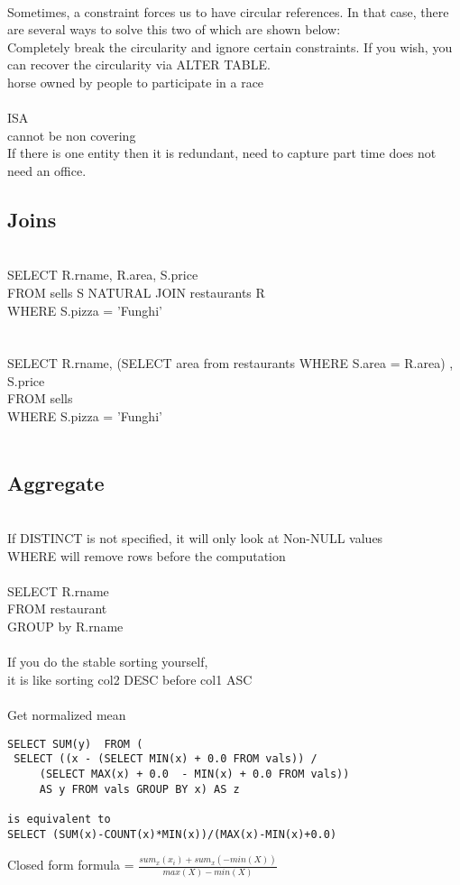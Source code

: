\documentclass[11pt]{article}
\begin{document}
\\
Sometimes, a constraint forces us to have circular references.  In that case, there are several ways to solve this two of which are shown below:
\\
Completely break the circularity and ignore certain constraints.
If you wish, you can recover the circularity via ALTER TABLE.
\\
horse owned by people to participate in a race
\\\\
ISA\\ 
cannot be non covering\\
If there is one entity then it is redundant, need to capture part time does not need an office.
\\
\subsection*{Joins}\\
SELECT R.rname, R.area, S.price\\
FROM sells S NATURAL JOIN restaurants R\\
WHERE S.pizza = 'Funghi'\\
\\\\
SELECT R.rname, (SELECT area from restaurants WHERE S.area = R.area) , S.price\\
FROM sells \\
WHERE S.pizza = 'Funghi'\\\\
\subsection*{Aggregate}\\
If DISTINCT is not specified, it will only look at Non-NULL values\\
WHERE will remove rows before the computation\\
\\
SELECT R.rname\\
FROM restaurant \\
GROUP by R.rname\\
\\
If you do the stable sorting yourself,\\
it is like sorting col2 DESC before col1 ASC
\\
\\
Get normalized mean
\begin{verbatim}
SELECT SUM(y)  FROM (
 SELECT ((x - (SELECT MIN(x) + 0.0 FROM vals)) /
	 (SELECT MAX(x) + 0.0  - MIN(x) + 0.0 FROM vals))  
	 AS y FROM vals GROUP BY x) AS z
	 
is equivalent to 
SELECT (SUM(x)-COUNT(x)*MIN(x))/(MAX(x)-MIN(x)+0.0)
\end{verbatim}
Closed form formula = $\frac{sum_{x}(x_{i}) + sum_{x} (-min(X))}{max(X) - min(X)}$
\end{document}
